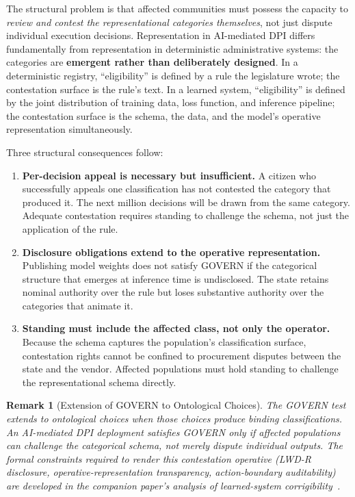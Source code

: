 \documentclass{article}
\newtheorem{remark}{Remark}[section]
\begin{document}
The structural problem is that affected communities must possess the capacity to \emph{review and contest the representational categories themselves}, not just dispute individual execution decisions. Representation in AI-mediated DPI differs fundamentally from representation in deterministic administrative systems: the categories are \textbf{emergent rather than deliberately designed}. In a deterministic registry, ``eligibility'' is defined by a rule the legislature wrote; the contestation surface is the rule's text. In a learned system, ``eligibility'' is defined by the joint distribution of training data, loss function, and inference pipeline; the contestation surface is the schema, the data, and the model's operative representation simultaneously.

Three structural consequences follow:

\begin{enumerate}[noitemsep]
    \item \textbf{Per-decision appeal is necessary but insufficient.} A citizen who successfully appeals one classification has not contested the category that produced it. The next million decisions will be drawn from the same category. Adequate contestation requires standing to challenge the schema, not just the application of the rule.
    \item \textbf{Disclosure obligations extend to the operative representation.} Publishing model weights does not satisfy GOVERN if the categorical structure that emerges at inference time is undisclosed. The state retains nominal authority over the rule but loses substantive authority over the categories that animate it.
    \item \textbf{Standing must include the affected class, not only the operator.} Because the schema captures the population's classification surface, contestation rights cannot be confined to procurement disputes between the state and the vendor. Affected populations must hold standing to challenge the representational schema directly.
\end{enumerate}

\begin{remark}[Extension of GOVERN to Ontological Choices]
\label{rem:govern-ontological}
The GOVERN test extends to ontological choices when those choices produce binding classifications. An AI-mediated DPI deployment satisfies GOVERN only if affected populations can challenge the categorical schema, not merely dispute individual outputs. The formal constraints required to render this contestation operative (LWD-R disclosure, operative-representation transparency, action-boundary auditability) are developed in the companion paper's analysis of learned-system corrigibility~\citep{aravind2026epi}.
\end{remark}
\end{document}
